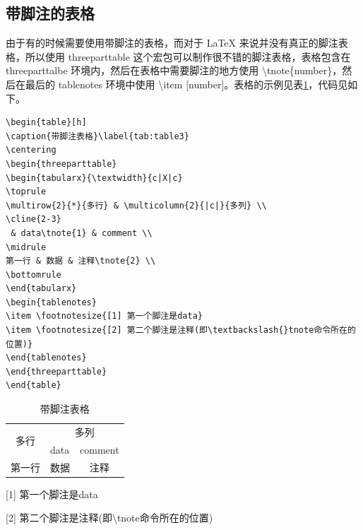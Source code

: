 \documentclass[a4paper,12pt]{article}
\begin{document}
\subsection{带脚注的表格}
由于有的时候需要使用带脚注的表格，而对于 \LaTeX{} 来说并没有真正的脚注表格，所以使用 threeparttable 这个宏包可以制作很不错的脚注表格，表格包含在 threeparttalbe 环境内，然后在表格中需要脚注的地方使用 \textbackslash{}tnote\{number\}，然后在最后的 tablenotes 环境中使用 \textbackslash{}item [number]。表格的示例见表\ref{tab:table3}，代码见如下。

\begin{verbatim}
\begin{table}[h]
\caption{带脚注表格}\label{tab:table3}
\centering
\begin{threeparttable}
\begin{tabularx}{\textwidth}{c|X|c}
\toprule
\multirow{2}{*}{多行} & \multicolumn{2}{|c|}{多列} \\
\cline{2-3}
 & data\tnote{1} & comment \\
\midrule
第一行 & 数据 & 注释\tnote{2} \\
\bottomrule
\end{tabularx}
\begin{tablenotes}
\item \footnotesize{[1] 第一个脚注是data}
\item \footnotesize{[2] 第二个脚注是注释(即\textbackslash{}tnote命令所在的位置)}
\end{tablenotes}
\end{threeparttable}
\end{table}
\end{verbatim}

\begin{table}[h]
\caption{带脚注表格}\label{tab:table3}
\centering
\begin{threeparttable}
\begin{tabularx}{\textwidth}{c|X|c}
\toprule
\multirow{2}{*}{多行} & \multicolumn{2}{c}{多列} \\
\cline{2-3}
 & data\tnote{1} & comment \\
\midrule
第一行 & 数据 & 注释\tnote{2} \\
\bottomrule
\end{tabularx}
\begin{tablenotes}
\item \footnotesize{[1] 第一个脚注是data}
\item \footnotesize{[2] 第二个脚注是注释(即\textbackslash{}tnote命令所在的位置)}
\end{tablenotes}
\end{threeparttable}
\end{table}
\end{document}
